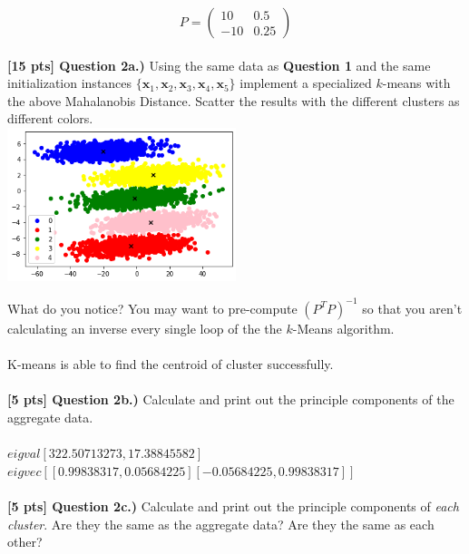 \documentclass[paper=a4, fontsize=11pt]{scrartcl} %
\begin{document}
\begin{equation}
 P = \left(
\begin{matrix}
10 & 0.5 \\
-10 & 0.25
\end{matrix}
\right) \nonumber
\end{equation}
\\

\textbf{[15 pts] Question 2a.)} Using the same data as \textbf{Question 1} and the same initialization instances $\{\textbf{x}_1, \textbf{x}_2, \textbf{x}_3, \textbf{x}_4, \textbf{x}_5 \}$ implement a specialized $k$-means with the above Mahalanobis Distance. Scatter the results with the different clusters as different colors. \\

\includegraphics[width=0.5\textwidth]{include/2a.png}

What do you notice? You may want to pre-compute $(P^T P)^{-1}$ so that you aren't calculating an inverse every single loop of the the $k$-Means algorithm. \\
\\
K-means is able to find the centroid of cluster successfully. \\
\\
\textbf{[5 pts] Question 2b.)}
Calculate and print out the principle components of the aggregate data. \\
\\
$eigval[322.50713273, 17.38845582]$\\
$eigvec[[ 0.99838317, 0.05684225][-0.05684225, 0.99838317]]$ \\
\\
\textbf{[5 pts] Question 2c.)}
Calculate and print out the principle components of \emph{each cluster}. Are they the same as the aggregate data? Are they the same as each other?\\
\end{document}
